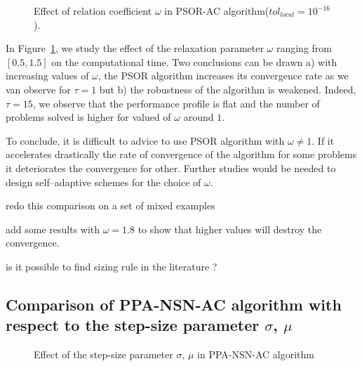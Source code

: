 \begin{figure}
  \centering
  \caption{Effect of relation coefficient $\omega$ in PSOR-AC algorithm($tol_{local} = 10^{-16}$).}
  \label{fig:PSOR/flpops}
\end{figure}

In Figure~\ref{fig:PSOR/flpops}, we study the effect of the relaxation parameter $\omega$ ranging from $[0.5,1.5]$ on the computational time.  Two conclusions can be drawn a) with increasing values of $\omega$, the PSOR algorithm increases its convergence rate as we van observe for $\tau=1$ but b) the robustness of the algorithm is weakened. Indeed, $\tau=15$, we observe that the performance profile is flat and the number of problems solved is higher for valued of $\omega$ around $1$.

To conclude, it is difficult to advice to use PSOR algorithm with $\omega\neq 1$. If it accelerates drastically the rate of convergence of the algorithm for some problems it deteriorates the convergence for other. Further studies would be needed to design self--adaptive schemes for the choice of $\omega$.

\begin{ndrva}
  \item redo this comparison on a set of mixed examples
  \item add some results with $\omega =1.8$ to show that higher values will destroy the convergence.
  \item is it possible to find sizing rule in the literature ?
\end{ndrva}



\subsection{Comparison of PPA-NSN-AC algorithm with respect to  the step-size parameter $\sigma$, $\mu$}

\begin{figure}
  \centering
  \caption{Effect of the step-size parameter $\sigma$, $\mu$ in PPA-NSN-AC algorithm}
  \label{fig:profile-Capsules-reduced-PPA-NSN-AC-1_10-time}
\end{figure}

